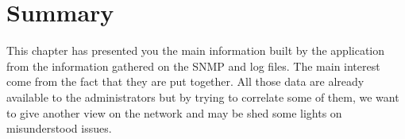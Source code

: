 \section{Summary}
This chapter has presented you the main information built by the application from the information gathered on the SNMP and log files. The main interest come from the fact that they are put together. All those data are already available to the administrators but by trying to correlate some of them, we want to give another view on the network and may be shed some lights on misunderstood issues. 

